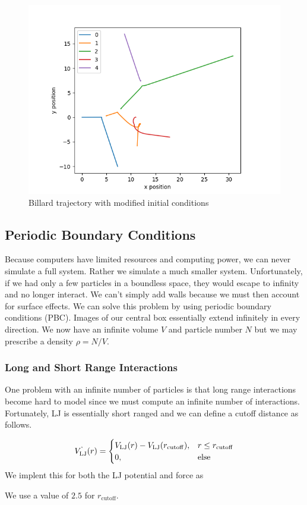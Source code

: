 \documentclass[11pt,a4paper]{scrartcl}
\makeatletter
\newcommand{\listfile}[6]{
}
\makeatother
\begin{document}
\begin{figure}[h]
\includegraphics[width=0.7\linewidth]{../fig/billardplt.png}
  \centering
  \caption{Billard trajectory with modified initial conditions}
\label{fig:bplot}
\end{figure}
\subsection{Periodic Boundary Conditions}
Because computers have limited resources and computing power, we can never simulate a full system. Rather we simulate a much smaller system. Unfortunately, if we had only a few particles in a boundless space, they would escape to infinity and no longer interact. We can't simply add walls because we must then account for surface effects. We can solve this problem by using periodic boundary conditions (PBC).  Images of our central box essentially extend infinitely in every direction. We now have an infinite volume $V$ and particle number $N$ but we may prescribe a density $\rho = N/V$.
\subsubsection{Long and Short Range Interactions}
One problem with an infinite number of particles is that long range interactions become hard to model since we must compute an infinite number of interactions. Fortunately, LJ is essentially short ranged and we can define a cutoff distance as follows.

\begin{equation*}
V^`_\mathrm{LJ}(r)=\begin{cases}
V_\mathrm{LJ}(r) - V_\mathrm{LJ}(r_\mathrm{cutoff}), & r \leq r_\mathrm{cutoff}\\
0, & \text{else}
\end{cases}
\end{equation*}
We implent this for both the LJ potential and force as
 \listfile{../src/ljlib.py}{/src/ljlib.py}{21}{35}{LJ Cutoff}{cuttoff}
We use a value of $2.5$ for $r_\mathrm{cutoff}$.
\end{document}
